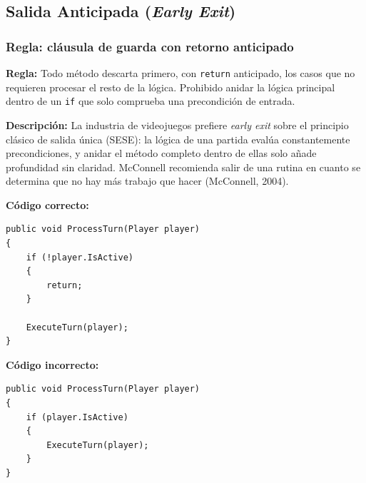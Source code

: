 \subsection{Salida Anticipada (\emph{Early Exit})}

\subsubsection{Regla: cláusula de guarda con retorno anticipado}

\textbf{Regla:} Todo método descarta primero, con \texttt{return} anticipado, los casos que no requieren procesar el resto de la lógica. Prohibido anidar la lógica principal dentro de un \texttt{if} que solo comprueba una precondición de entrada.

\textbf{Descripción:} La industria de videojuegos prefiere \emph{early exit} sobre el principio clásico de salida única (SESE): la lógica de una partida evalúa constantemente precondiciones, y anidar el método completo dentro de ellas solo añade profundidad sin claridad. McConnell recomienda salir de una rutina en cuanto se determina que no hay más trabajo que hacer (McConnell, 2004).

\textbf{Código correcto:}
\begin{lstlisting}[style=csharpstyle]
public void ProcessTurn(Player player)
{
    if (!player.IsActive)
    {
        return;
    }

    ExecuteTurn(player);
}
\end{lstlisting}

\textbf{Código incorrecto:}
\begin{lstlisting}[style=csharpstyle]
public void ProcessTurn(Player player)
{
    if (player.IsActive)
    {
        ExecuteTurn(player);
    }
}
\end{lstlisting}
